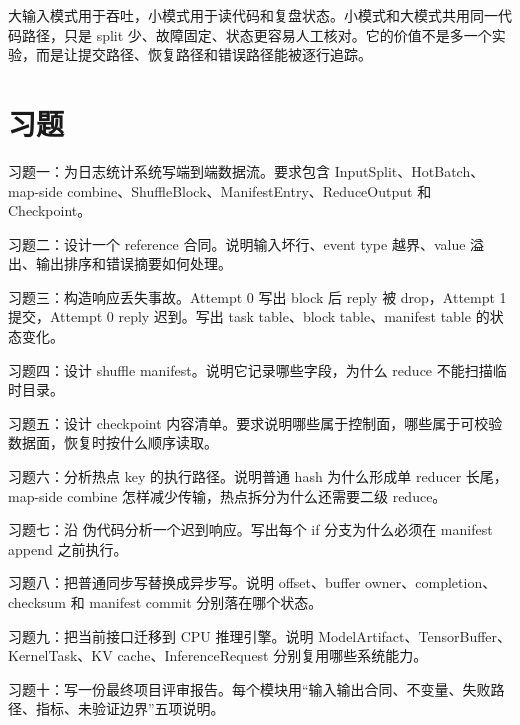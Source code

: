 大输入模式用于吞吐，小模式用于读代码和复盘状态。小模式和大模式共用同一代码路径，只是 split 少、故障固定、状态更容易人工核对。它的价值不是多一个实验，而是让提交路径、恢复路径和错误路径能被逐行追踪。

\section{习题}

\begin{exercisebox}
习题一：为日志统计系统写端到端数据流。要求包含 InputSplit、HotBatch、map-side combine、ShuffleBlock、ManifestEntry、ReduceOutput 和 Checkpoint。

习题二：设计一个 reference 合同。说明输入坏行、event type 越界、value 溢出、输出排序和错误摘要如何处理。

习题三：构造响应丢失事故。Attempt 0 写出 block 后 reply 被 drop，Attempt 1 提交，Attempt 0 reply 迟到。写出 task table、block table、manifest table 的状态变化。

习题四：设计 shuffle manifest。说明它记录哪些字段，为什么 reduce 不能扫描临时目录。

习题五：设计 checkpoint 内容清单。要求说明哪些属于控制面，哪些属于可校验数据面，恢复时按什么顺序读取。

习题六：分析热点 key 的执行路径。说明普通 hash 为什么形成单 reducer 长尾，map-side combine 怎样减少传输，热点拆分为什么还需要二级 reduce。

习题七：沿  伪代码分析一个迟到响应。写出每个 if 分支为什么必须在 manifest append 之前执行。

习题八：把普通同步写替换成异步写。说明 offset、buffer owner、completion、checksum 和 manifest commit 分别落在哪个状态。

习题九：把当前接口迁移到 CPU 推理引擎。说明 ModelArtifact、TensorBuffer、KernelTask、KV cache、InferenceRequest 分别复用哪些系统能力。

习题十：写一份最终项目评审报告。每个模块用“输入输出合同、不变量、失败路径、指标、未验证边界”五项说明。
\end{exercisebox}
